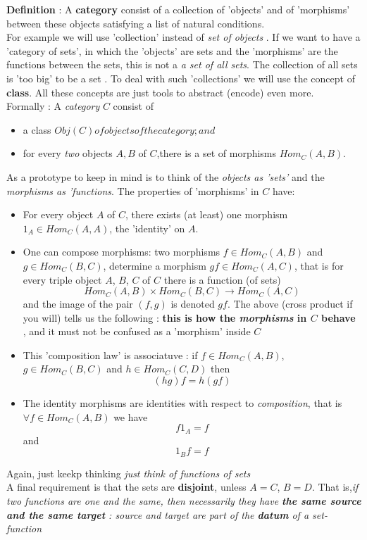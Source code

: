 \documentclass[10pt]{article}
\theoremstyle{plain}
\theoremstyle{definition}
\begin{document}
\textbf{Definition} : A \textbf{category} consist of a collection of 'objects' and of 'morphisms' between these objects satisfying a list of natural conditions. \\
For example we will use 'collection' instead of \textit{set of objects} . If we want to have a 'category of sets', in which the 'objects' are sets and the 'morphisms' are the functions between the sets, this is not a \textit{a set of all sets}. The collection of all sets is 'too big' to be a set . To deal with such 'collections' we will use the concept of \textbf{class}. All these concepts are just tools to abstract (encode) even more. \\

Formally : A \textit{category} $C$ consist of 
\begin{itemize}
	\item a class $Obj(C) of objects of the category; and$
	\item for every \textit{two} objects $A,B$ of $C$,there is a set of morphisms $Hom_C (A,B)$.
\end{itemize}

As a prototype to keep in mind is to think of the \textit{objects as 'sets'} and the \textit{morphisms as 'functions}. The properties of 'morphisms' in $C$ have:
\begin{itemize}
	\item For every object $A$ of $C$, there exists (at least) one morphism $1_A \in Hom_C (A,A)$, the 'identity' on $A$.
	\item One can compose morphisms: two morphisms $f \in Hom_C (A,B)$ and $g \in Hom_C (B,C)$, determine a morphism $gf \in Hom_C (A,C)$, that is for every triple object $A$, $B$, $C$ of $C$ there is a function (of sets)
	$$Hom_C (A,B) \times Hom_C (B,C) \rightarrow Hom_C (A,C)$$
	 and the image of the pair $(f,g)$ is denoted $gf$. The above (cross product if you will) tells us the following : \textbf{this is how the \textit{morphisms} in $C$ behave } , and it must not be confused as a 'morphism' inside $C$
	\item This 'composition law' is associatuve : if $f \in Hom_C (A,B)$, $g \in Hom_C (B,C)$ and $h \in Hom_C (C,D)$ then 
	$$(hg)f = h(gf)$$
    \item The identity morphisms are identities with respect to \textit{composition}, that is $\forall f \in Hom_C(A,B)$ we have 
    $$f1_A = f$$
    and 
    $$1_B f = f$$
\end{itemize}
 Again, just keekp thinking \textit{just think of functions of sets}
 \\
 A final requirement is that the sets are \textbf{disjoint}, unless $A = C$, $B = D$. That is,\textit{if two functions are one and the same, then necessarily they have \textbf{the same source and the same target} : source and target are part of the \textbf{datum} of a set-function}
 
\end{document}
